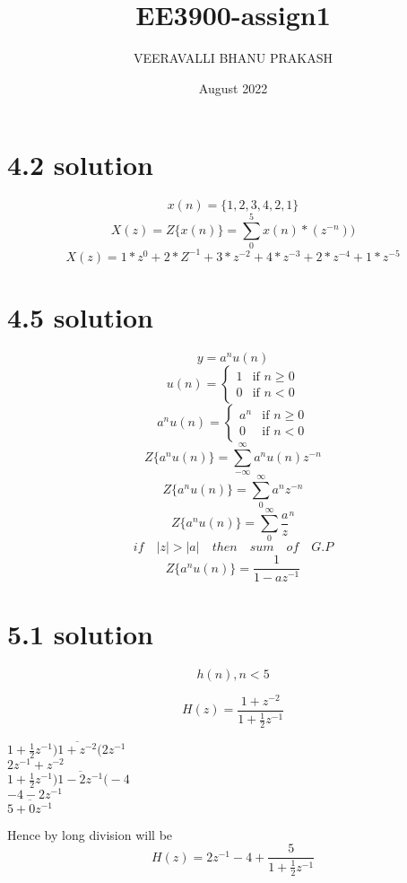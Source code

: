 \documentclass{article}
\title{EE3900-assign1}
\author{VEERAVALLI BHANU PRAKASH}
\date{August 2022}
\begin{document}
\maketitle

\section{4.2 solution}
$$x(n)={\{1, 2, 3, 4, 2, 1\}}$$
$$X(z)=Z\{x(n)\}=\sum_{0}^{5}x(n)*(z^{-n}))$$
$$X(z)=1*z^{0}+2*Z^{-1}+3*z^{-2}+4*z^{-3}+2*z^{-4}+1*z^{-5}$$
\section{4.5 solution}
$$y=a^nu(n)$$
$$u(n)=
\left\{
	\begin{array}{ll}
		1 & \mbox{if } n \geq 0 \\
		0 & \mbox{if } n < 0
	\end{array}
\right.$$
$$a^nu(n)=
\left\{
	\begin{array}{ll}
		a^n & \mbox{if } n \geq 0 \\
		0 & \mbox{if } n < 0
	\end{array}
\right.$$
$$Z{\{a^nu(n)\}}=\sum_{-\infty}^{\infty}a^nu(n)z^{-n}$$
$$Z{\{a^nu(n)\}}=\sum_{0}^{\infty}a^nz^{-n}$$
$$Z{\{a^nu(n)\}}=\sum_{0}^{\infty}{\frac{a}{z}}^n$$
$$ if \quad|z|>|a|\quad then \quad sum \quad of \quad G.P$$
$$Z{\{a^nu(n)\}}=\frac{1}{1-{az^{-1}}}$$
\section{5.1 solution }
\begin{equation}
    h(n) , n<5
\end{equation}

\begin{equation}
    H(z) = \frac{1 + z^{-2}}{1 + \frac{1}{2}z^{-1}}
\end{equation}
\begin{center}
    $1 + \frac{1}{2}z^{-1}\overline{)1 + z^{-2}(} 2z^{-1}$\\
    ${2z^{-1} + z^{-2}}$\\
    $1 + \frac{1}{2}z^{-1}\overline{)1-2z^{-1}(} -4$\\
    $-4 - 2z^{-1}$\\
    $\overline{5 + 0z^{-1}}$
\end{center}
Hence by long division will be 
\begin{equation}
    H(z) = 2z^{-1} -4 + \frac{5}{1 + \frac{1}{2}z^{-1}}
\end{equation}
\end{document}
